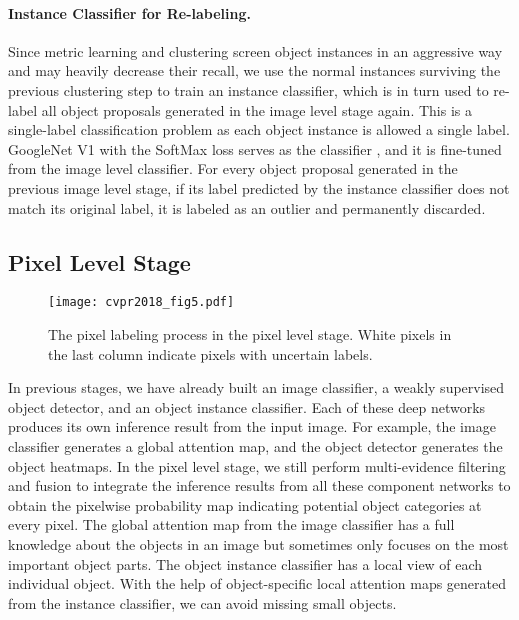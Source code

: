 \documentclass[10pt,twocolumn,letterpaper]{article}
\begin{document}
\paragraph{Instance Classifier for Re-labeling.} Since metric learning and clustering screen object instances in an aggressive way and may heavily decrease their recall, we use the normal instances surviving the previous clustering step to train an instance classifier, which is in turn used to re-label all object proposals generated in the image level stage again.
This is a single-label classification problem as each object instance is allowed a single label. GoogleNet V1 with the SoftMax loss serves as the classifier , and it is fine-tuned from the image level classifier. For every object proposal generated in the previous image level stage, if its label predicted by the instance classifier does not match its original label, it is labeled as an outlier and permanently discarded.



\subsection{Pixel Level Stage}

\begin{figure*}[ht]
  \centering
  \texttt{[image: cvpr2018\_fig5.pdf]}
  \caption{The pixel labeling process in the pixel level stage. White pixels in the last column indicate pixels with uncertain labels.\vspace{-2mm}}
  \label{Fig:Pixel Level Stage}
\end{figure*}

In previous stages, we have already built an image classifier, a weakly supervised object detector, and an object instance classifier. Each of these deep networks produces its own inference result from the input image. For example, the image classifier generates a global attention map, and the object detector generates the object heatmaps. In the pixel level stage, we still perform multi-evidence filtering and fusion to integrate the inference results from all these component networks to obtain the pixelwise probability map indicating potential object categories at every pixel. The global attention map  from the image classifier has a full knowledge about the objects in an image but sometimes only focuses on the most important object parts. The object instance classifier has a local view of each individual object. With the help of object-specific local attention maps generated from the instance classifier, we can avoid missing small objects.
\end{document}
